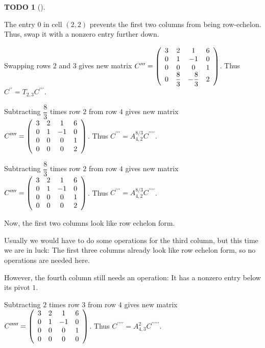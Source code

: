 \documentclass[numbers=enddot,12pt,final,onecolumn,notitlepage]{scrartcl}%
\theoremstyle{definition}
\newtheorem{quest}[theo]{TODO}
\newenvironment{todo}[1][]
{\begin{quest}[#1]\begin{leftbar}}
{\end{leftbar}\end{quest}}
\begin{document}
\begin{todo}
The entry $0$ in cell $\left(  2,2\right)  $ prevents the first two columns
from being row-echelon. Thus, swap it with a nonzero entry further down.

Swapping rows $2$ and $3$ gives new matrix $C^{\prime\prime\prime}=\left(
\begin{array}
[c]{cccc}%
3 & 2 & 1 & 6\\
0 & 1 & -1 & 0\\
0 & 0 & 0 & 1\\
0 & \dfrac{8}{3} & -\dfrac{8}{3} & 2
\end{array}
\right)  $. Thus $C^{\prime\prime}=T_{2,3}C^{\prime\prime\prime}$.

Subtracting $\dfrac{8}{3}$ times row $2$ from row $4$ gives new matrix
$C^{\prime\prime\prime\prime}=\left(
\begin{array}
[c]{cccc}%
3 & 2 & 1 & 6\\
0 & 1 & -1 & 0\\
0 & 0 & 0 & 1\\
0 & 0 & 0 & 2
\end{array}
\right)  $. Thus $C^{\prime\prime\prime}=A_{4,2}^{8/3}C^{\prime\prime
\prime\prime}$.

Subtracting $\dfrac{8}{3}$ times row $2$ from row $4$ gives new matrix
$C^{\prime\prime\prime\prime}=\left(
\begin{array}
[c]{cccc}%
3 & 2 & 1 & 6\\
0 & 1 & -1 & 0\\
0 & 0 & 0 & 1\\
0 & 0 & 0 & 2
\end{array}
\right)  $. Thus $C^{\prime\prime\prime}=A_{4,2}^{8/3}C^{\prime\prime
\prime\prime}$.

Now, the first two columns look like row echelon form.

Usually we would have to do some operations for the third column, but this
time we are in luck: The first three columns already look like row echelon
form, so no operations are needed here.

However, the fourth column still needs an operation: It has a nonzero entry
below its pivot $1$.

Subtracting $2$ times row $3$ from row $4$ gives new matrix $C^{\prime
\prime\prime\prime\prime}=\left(
\begin{array}
[c]{cccc}%
3 & 2 & 1 & 6\\
0 & 1 & -1 & 0\\
0 & 0 & 0 & 1\\
0 & 0 & 0 & 0
\end{array}
\right)  $. Thus $C^{\prime\prime\prime\prime}=A_{4,3}^{2}C^{\prime
\prime\prime\prime\prime}$.


\end{todo}
\end{document}
